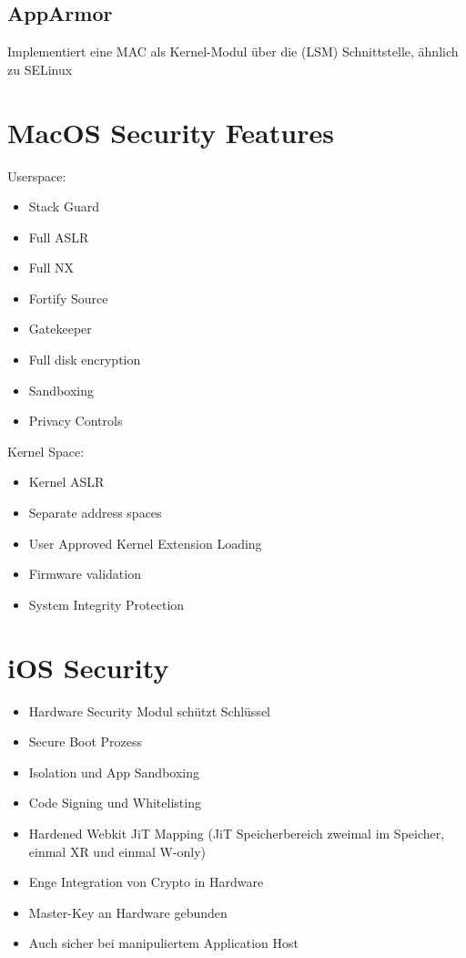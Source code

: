 \subsection{AppArmor}
Implementiert eine MAC als Kernel-Modul über die (LSM) Schnittstelle, ähnlich zu SELinux

\section{MacOS Security Features}
Userspace:
\begin{itemize}
    \item Stack Guard
    \item Full ASLR
    \item Full NX
    \item Fortify Source
    \item Gatekeeper
    \item Full disk encryption
    \item Sandboxing
    \item Privacy Controls
\end{itemize}

Kernel Space:
\begin{itemize}
    \item Kernel ASLR
    \item Separate address spaces
    \item User Approved Kernel Extension Loading
    \item Firmware validation
    \item System Integrity Protection
\end{itemize}

\section{iOS Security}
\begin{itemize}
    \item Hardware Security Modul schützt Schlüssel
    \item Secure Boot Prozess
    \item Isolation und App Sandboxing
    \item Code Signing und Whitelisting
    \item Hardened Webkit JiT Mapping (JiT Speicherbereich zweimal im Speicher, einmal XR und einmal W-only)
    \item Enge Integration von Crypto in Hardware
    \item Master-Key an Hardware gebunden
    \item Auch sicher bei manipuliertem Application Host
\end{itemize}

